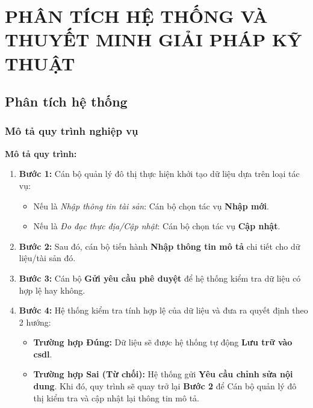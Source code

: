 \section{PHÂN TÍCH HỆ THỐNG VÀ THUYẾT MINH GIẢI PHÁP KỸ THUẬT
}
\subsection{Phân tích hệ thống}
\subsubsection{Mô tả quy trình nghiệp vụ}

\textbf{Mô tả quy trình:}
\begin{enumerate}
    \item \textbf{Bước 1:} Cán bộ quản lý đô thị thực hiện khởi tạo dữ liệu dựa trên loại tác vụ:
    \begin{itemize}
        \item Nếu là \textit{Nhập thông tin tài sản}: Cán bộ chọn tác vụ \textbf{Nhập mới}.
        \item Nếu là \textit{Đo đạc thực địa/Cập nhật}: Cán bộ chọn tác vụ \textbf{Cập nhật}.
    \end{itemize}
    
    \item \textbf{Bước 2:} Sau đó, cán bộ tiến hành \textbf{Nhập thông tin mô tả} chi tiết cho dữ liệu/tài sản đó.
    
    \item \textbf{Bước 3:} Cán bộ \textbf{Gửi yêu cầu phê duyệt} để hệ thống kiểm tra dữ liệu có hợp lệ hay không.
    
    \item \textbf{Bước 4:} Hệ thống kiểm tra tính hợp lệ của dữ liệu và đưa ra quyết định theo 2 hướng:
    \begin{itemize}
        \item \textbf{Trường hợp Đúng:} Dữ liệu sẽ được hệ thống tự động \textbf{Lưu trữ vào \gls{csdl}}.
        \item \textbf{Trường hợp Sai (Từ chối):} Hệ thống gửi \textbf{Yêu cầu chỉnh sửa nội dung}. Khi đó, quy trình sẽ quay trở lại \textbf{Bước 2} để Cán bộ quản lý đô thị kiểm tra và cập nhật lại thông tin mô tả.
    \end{itemize}
\end{enumerate}
